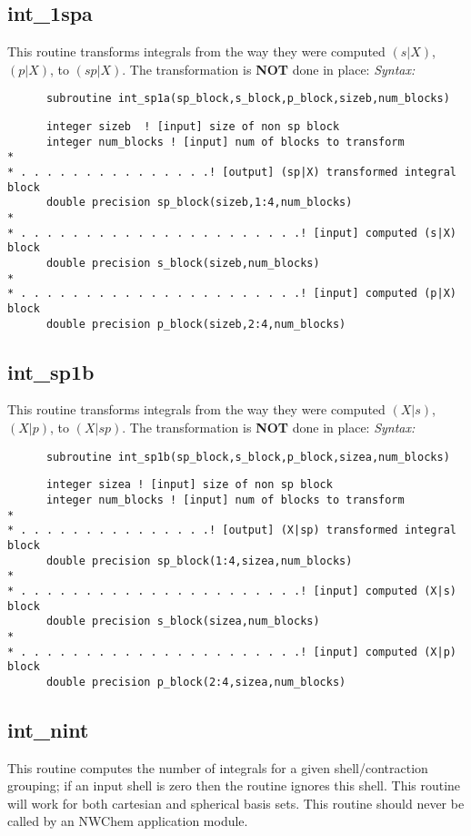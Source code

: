 \subsection{int\_1spa} 
This routine transforms integrals from the way they 
were computed $(s|X)$, $(p|X)$, to $(sp|X)$. 
The transformation is {\bf NOT} done in place: 
{\it Syntax:} 
\begin{verbatim} 
      subroutine int_sp1a(sp_block,s_block,p_block,sizeb,num_blocks) 
\end{verbatim} 
\begin{verbatim} 
      integer sizeb  ! [input] size of non sp block 
      integer num_blocks ! [input] num of blocks to transform 
* 
* . . . . . . . . . . . . . . .! [output] (sp|X) transformed integral block 
      double precision sp_block(sizeb,1:4,num_blocks)  
* 
* . . . . . . . . . . . . . . . . . . . . . .! [input] computed (s|X) block 
      double precision s_block(sizeb,num_blocks) 
* 
* . . . . . . . . . . . . . . . . . . . . . .! [input] computed (p|X) block 
      double precision p_block(sizeb,2:4,num_blocks) 
\end{verbatim} 
\subsection{int\_sp1b} 
This routine transforms integrals from the way they 
were computed $(X|s)$, $(X|p)$, to $(X|sp)$. 
The transformation is {\bf NOT} done in place: 
{\it Syntax:} 
\begin{verbatim} 
      subroutine int_sp1b(sp_block,s_block,p_block,sizea,num_blocks) 
\end{verbatim} 
\begin{verbatim} 
      integer sizea ! [input] size of non sp block 
      integer num_blocks ! [input] num of blocks to transform 
* 
* . . . . . . . . . . . . . . .! [output] (X|sp) transformed integral block 
      double precision sp_block(1:4,sizea,num_blocks) 
* 
* . . . . . . . . . . . . . . . . . . . . . .! [input] computed (X|s) block 
      double precision s_block(sizea,num_blocks) 
* 
* . . . . . . . . . . . . . . . . . . . . . .! [input] computed (X|p) block 
      double precision p_block(2:4,sizea,num_blocks) 
\end{verbatim} 
\subsection{int\_nint} 
This routine computes the number of integrals for a given  
shell/contraction grouping; if an input shell is zero then  
the routine ignores this shell.  This routine will work  
for both cartesian and spherical basis sets. 
This routine should never be called by an NWChem  
application module. 
 
